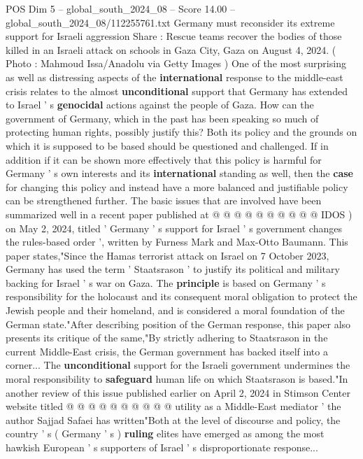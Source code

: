 \begin{textsample}{POS Dim 5 – global\_south\_2024\_08 – Score 14.00 – global\_south\_2024\_08/112255761.txt}  \label{ex:f5_pos_324}
Germany must reconsider its extreme support for Israeli aggression Share : Rescue teams recover the bodies of those killed in an Israeli attack on schools in Gaza City, Gaza on August 4, 2024. ( Photo : Mahmoud Issa/Anadolu via Getty Images ) One of the most surprising as well as distressing aspects of the \textbf{international} response to the middle-east crisis relates to the almost \textbf{unconditional} support that Germany has extended to Israel ' s \textbf{genocidal} actions against the people of Gaza.
How can the government of Germany, which in the past has been speaking so much of protecting human rights, possibly justify this?
Both its policy and the grounds on which it is supposed to be based should be questioned and challenged.
If in addition if it can be shown more effectively that this policy is harmful for Germany ' s own interests and its \textbf{international} standing as well, then the \textbf{case} for changing this policy and instead have a more balanced and justifiable policy can be strengthened further.
The basic issues that are involved have been summarized well in a recent paper published at @ @ @ @ @ @ @ @ @ @ IDOS ) on May 2, 2024, titled ' Germany ' s support for Israel ' s government changes the rules-based order ', written by Furness Mark and Max-Otto Baumann.
This paper states,"Since the Hamas terrorist attack on Israel on 7 October 2023, Germany has used the term ' Staatsrason ' to justify its political and military backing for Israel ' s war on Gaza.
The \textbf{principle} is based on Germany ' s responsibility for the holocaust and its consequent moral obligation to protect the Jewish people and their homeland, and is considered a moral foundation of the German state."After describing position of the German response, this paper also presents its critique of the same,"By strictly adhering to Staatsrason in the current Middle-East crisis, the German government has backed itself into a corner...
The \textbf{unconditional} support for the Israeli government undermines the moral responsibility to \textbf{safeguard} human life on which Staatsrason is based."In another review of this issue published earlier on April 2, 2024 in Stimson Center website titled @ @ @ @ @ @ @ @ @ @ utility as a Middle-East mediator ' the author Sajjad Safaei has written"Both at the level of discourse and policy, the country ' s ( Germany ' s ) \textbf{ruling} elites have emerged as among the most hawkish European ' s supporters of Israel ' s disproportionate response...

\end{textsample}

